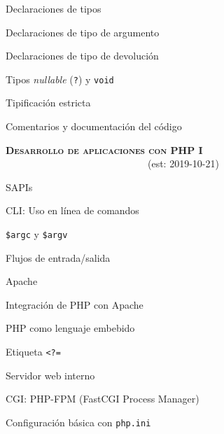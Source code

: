 \begin{longenum}
\begin{longenum}
\begin{longenum}
            \item Declaraciones de tipos
            \begin{longenum}
                \item Declaraciones de tipo de argumento
                \item Declaraciones de tipo de devolución
                \item Tipos \textit{nullable} (\texttt{?}) y \texttt{void}
                \item Tipificación estricta
            \end{longenum}
        \end{longenum}
        \item Comentarios y documentación del código
    \end{longenum}
    \item \textbf{\textsc{Desarrollo de aplicaciones con PHP I}} \ \ \ \ \ \ \ \ \ \ \ \ \ \ \ \ \ \ \ \ \ \ \ \ \ \ \ \ \ (est: \mbox{2019-10-21})
    \begin{longenum}
        \item SAPIs
        \begin{longenum}
            \item CLI: Uso en línea de comandos
            \begin{longenum}
                \item \texttt{\$argc} y \texttt{\$argv}
                \item Flujos de entrada/salida
            \end{longenum}
            \item Apache
            \begin{longenum}
                \item Integración de PHP con Apache
                \item PHP como lenguaje embebido
                \item Etiqueta \texttt{<?=}
                \item Servidor web  interno
            \end{longenum}
            \item CGI: PHP-FPM (FastCGI Process Manager)
            \item Configuración básica con \texttt{php.ini}
            \begin{longenum}

\end{longenum}
\end{longenum}
\end{longenum}
\end{longenum}
